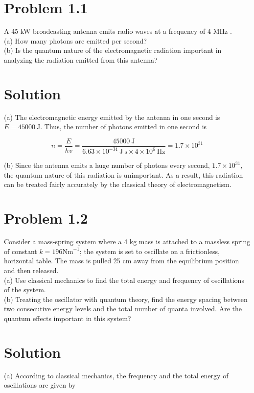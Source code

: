 \documentclass[10pt]{article}
\begin{document}
\section*{Problem 1.1}
A 45 kW broadcasting antenna emits radio waves at a frequency of 4 MHz .\\
(a) How many photons are emitted per second?\\
(b) Is the quantum nature of the electromagnetic radiation important in analyzing the radiation emitted from this antenna?

\section*{Solution}
(a) The electromagnetic energy emitted by the antenna in one second is $E=45000 \mathrm{~J}$. Thus, the number of photons emitted in one second is


\begin{equation*}
n=\frac{E}{h v}=\frac{45000 \mathrm{~J}}{6.63 \times 10^{-34} \mathrm{~J} \mathrm{~s} \times 4 \times 10^{6} \mathrm{~Hz}}=1.7 \times 10^{31} \tag{1.158}
\end{equation*}


(b) Since the antenna emits a huge number of photons every second, $1.7 \times 10^{31}$, the quantum nature of this radiation is unimportant. As a result, this radiation can be treated fairly accurately by the classical theory of electromagnetism.

\section*{Problem 1.2}
Consider a mass-spring system where a 4 kg mass is attached to a massless spring of constant $k=196 \mathrm{Nm}^{-1}$; the system is set to oscillate on a frictionless, horizontal table. The mass is pulled 25 cm away from the equilibrium position and then released.\\
(a) Use classical mechanics to find the total energy and frequency of oscillations of the system.\\
(b) Treating the oscillator with quantum theory, find the energy spacing between two consecutive energy levels and the total number of quanta involved. Are the quantum effects important in this system?

\section*{Solution}
(a) According to classical mechanics, the frequency and the total energy of oscillations are given by
\end{document}
